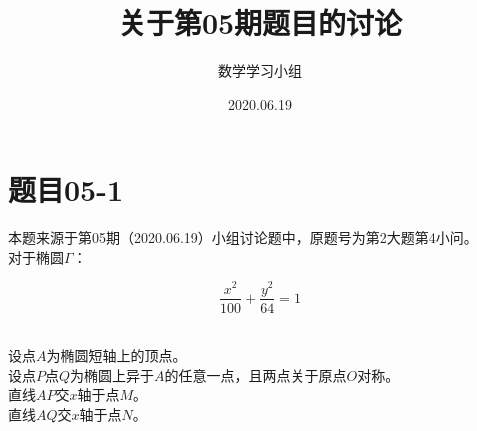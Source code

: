 \documentclass[UTF8]{ctexart}
\title{关于第05期题目的讨论}
\author{数学学习小组}
\date{2020.06.19}
\begin{document}
\maketitle

\newpage

\tableofcontents

\newpage

\setlength{\parindent}{0pt}
\setlength{\columnseprule}{0.4pt}
\setlength{\columnsep}{40pt}

\section{题目05-1}
    本题来源于第05期（2020.06.19）小组讨论题中，原题号为第2大题第4小问。\\[3mm]
    对于椭圆$\Gamma$：
    \begin{large}
        \begin{equation*}
            \frac{x^2}{100}+\frac{y^2}{64}=1
        \end{equation*}
    \end{large}\\
    设点$A$为椭圆短轴上的顶点。\\[3mm]
    设点$P$点$Q$为椭圆上异于$A$的任意一点，且两点关于原点$O$对称。\\[3mm]
    直线$AP$交$x$轴于点$M$。\\[3mm]
    直线$AQ$交$x$轴于点$N$。
\end{document}
